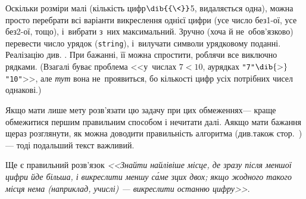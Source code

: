 
Оскільки розміри малі (кількість цифр$\dib{{\<}}$5, видаляється одна), 
можна просто
перебрати всі варіанти викреслення однієї цифри (усе число без\nolinebreak[3] \mbox{1-ої}, усе без\nolinebreak[3] \mbox{2-ої}, тощо), і~вибрати з~них максимальний. Зручно (хоча й не~обов'язково) перевести число у\nolinebreak[3] рядок (\verb"string"), і~вилучати символи у\nolinebreak[3] рядковому поданні. Реалізацію див. .
При бажанні, її можна спростити, роблячи все виключно рядками. (Взагалі буває проблема <<у~числах ${7{<}10}$, а\nolinebreak[3] у\nolinebreak[3] рядках \verb|"7"|$\dib{{>}}$\verb|"10"|>>, але \emph{тут} вона не~проявиться, бо кількості цифр усіх потрібних чисел однакові.)

Якщо мати лише мету розв'язати цю задачу при цих обмеженнях\nolinebreak[3] --- краще обмежитися першим правильним способом і не\nolinebreak[3] читати далі. А\nolinebreak[3] якщо мати бажання ще\nolinebreak[2] раз розглянути, як можна доводити правильність алгоритма (див.\nolinebreak[3] також стор.~\pageref{text:need-or-no-need-to-prove})\nolinebreak[3] --- тоді подальший текст важливий. 

Ще є правильний розв’язок \textsl{<<Знайти найлівіше місце, де зразу після меншої цифри йде більша, і викреслити меншу с\'{а}ме з\nolinebreak[2] цих двох; якщо жодного такого місця нема (наприклад, у\nolinebreak[3] числі) --- викреслити останню цифру>>}.

